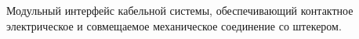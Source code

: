 Модульный интерфейс кабельной системы, обеспечивающий 
контактное электрическое и совмещаемое механическое
соединение со штекером.
